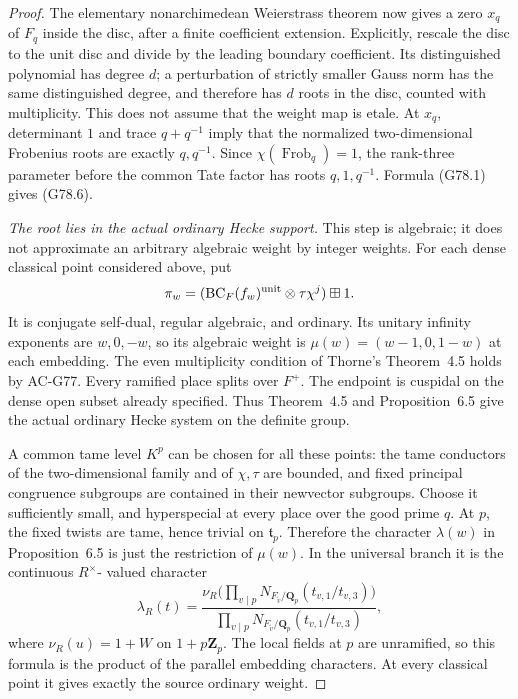 \begin{proof}
The elementary nonarchimedean Weierstrass theorem now gives
a zero \(x_q\) of \(F_q\) inside the disc, after a finite
coefficient extension.
Explicitly, rescale the disc to the unit disc and divide
by the leading boundary coefficient.  Its distinguished
polynomial has degree \(d\); a perturbation of strictly
smaller Gauss norm has the same distinguished degree,
and therefore has \(d\) roots in the disc, counted with
multiplicity.
This does not assume that the weight map is etale.
At \(x_q\), determinant \(1\) and trace \(q+q^{-1}\) imply
that the normalized two-dimensional Frobenius roots
are exactly \(q,q^{-1}\).
Since \(\chi(\operatorname{Frob}_q)=1\), the rank-three
parameter before the common Tate factor has roots
\(q,1,q^{-1}\).
Formula (G78.1) gives (G78.6).

\emph{The root lies in the actual ordinary Hecke support.}
This step is algebraic; it does not approximate an arbitrary
algebraic weight by integer weights.
For each dense classical point considered above, put
\[
 \pi_w=(\operatorname{BC}_F(f_w)^{\rm unit}\otimes
                    \tau\chi^j)\boxplus1 .
\]
It is conjugate self-dual, regular algebraic, and ordinary.
Its unitary infinity exponents are \(w,0,-w\), so its
algebraic weight is
\(\mu(w)=(w-1,0,1-w)\) at each embedding.
The even multiplicity condition of Thorne's
Theorem~4.5 holds by AC-G77.
Every ramified place splits over \(F^+\).
The endpoint is cuspidal on the dense open subset already
specified.  Thus Theorem~4.5 and Proposition~6.5 give the
actual ordinary Hecke system on the definite group.

A common tame level \(K^p\) can be chosen for all these
points: the tame conductors of the two-dimensional family
and of \(\chi,\tau\) are bounded, and fixed principal
congruence subgroups are contained in their newvector
subgroups.  Choose it sufficiently small, and hyperspecial
at every place over the good prime \(q\).
At \(p\), the fixed twists are tame, hence trivial on
\(\mathfrak t_p\).  Therefore the character
\(\lambda(w)\) in Proposition~6.5 is just the restriction
of \(\mu(w)\).
In the universal branch it is the continuous \(R^\times\)-
valued character
\[
 \lambda_R(t)=
 \frac{\nu_R\bigl(\prod_{v\mid p}
             N_{F_{\widetilde v}/\mathbf Q_p}(t_{v,1}/t_{v,3})\bigr)}
      {\prod_{v\mid p}
             N_{F_{\widetilde v}/\mathbf Q_p}(t_{v,1}/t_{v,3})},
 \tag{G78.10}
\]
where \(\nu_R(u)=1+W\) on \(1+p\mathbf Z_p\).
The local fields at \(p\) are unramified, so this formula
is the product of the parallel embedding characters.
At every classical point it gives exactly the source
ordinary weight.


\end{proof}

